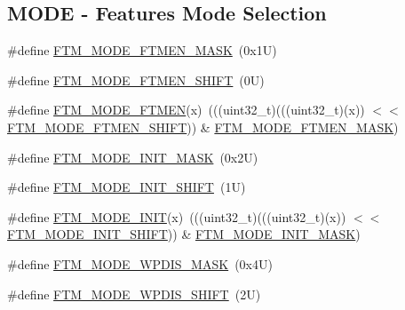 \subsection*{M\+O\+DE -\/ Features Mode Selection}
\begin{DoxyCompactItemize}
\item 
\#define \mbox{\hyperlink{group___f_t_m___register___masks_ga3142bc5c6261a7c04c95844ef35edd5b}{F\+T\+M\+\_\+\+M\+O\+D\+E\+\_\+\+F\+T\+M\+E\+N\+\_\+\+M\+A\+SK}}~(0x1\+U)
\item 
\#define \mbox{\hyperlink{group___f_t_m___register___masks_ga38df569e214287fa43254c2ddeafa5b5}{F\+T\+M\+\_\+\+M\+O\+D\+E\+\_\+\+F\+T\+M\+E\+N\+\_\+\+S\+H\+I\+FT}}~(0\+U)
\item 
\#define \mbox{\hyperlink{group___f_t_m___register___masks_ga9546f297f398bafc35e8c72c670b07a0}{F\+T\+M\+\_\+\+M\+O\+D\+E\+\_\+\+F\+T\+M\+EN}}(x)~(((uint32\+\_\+t)(((uint32\+\_\+t)(x)) $<$$<$ \mbox{\hyperlink{group___f_t_m___register___masks_ga38df569e214287fa43254c2ddeafa5b5}{F\+T\+M\+\_\+\+M\+O\+D\+E\+\_\+\+F\+T\+M\+E\+N\+\_\+\+S\+H\+I\+FT}})) \& \mbox{\hyperlink{group___f_t_m___register___masks_ga3142bc5c6261a7c04c95844ef35edd5b}{F\+T\+M\+\_\+\+M\+O\+D\+E\+\_\+\+F\+T\+M\+E\+N\+\_\+\+M\+A\+SK}})
\item 
\#define \mbox{\hyperlink{group___f_t_m___register___masks_ga069f8d36fce3b99bf22cf8e588b855bf}{F\+T\+M\+\_\+\+M\+O\+D\+E\+\_\+\+I\+N\+I\+T\+\_\+\+M\+A\+SK}}~(0x2\+U)
\item 
\#define \mbox{\hyperlink{group___f_t_m___register___masks_ga0d0d007a2359f31a0cf50b06acef810c}{F\+T\+M\+\_\+\+M\+O\+D\+E\+\_\+\+I\+N\+I\+T\+\_\+\+S\+H\+I\+FT}}~(1\+U)
\item 
\#define \mbox{\hyperlink{group___f_t_m___register___masks_ga263317f5ce69cdbd5bf2353b64d65325}{F\+T\+M\+\_\+\+M\+O\+D\+E\+\_\+\+I\+N\+IT}}(x)~(((uint32\+\_\+t)(((uint32\+\_\+t)(x)) $<$$<$ \mbox{\hyperlink{group___f_t_m___register___masks_ga0d0d007a2359f31a0cf50b06acef810c}{F\+T\+M\+\_\+\+M\+O\+D\+E\+\_\+\+I\+N\+I\+T\+\_\+\+S\+H\+I\+FT}})) \& \mbox{\hyperlink{group___f_t_m___register___masks_ga069f8d36fce3b99bf22cf8e588b855bf}{F\+T\+M\+\_\+\+M\+O\+D\+E\+\_\+\+I\+N\+I\+T\+\_\+\+M\+A\+SK}})
\item 
\#define \mbox{\hyperlink{group___f_t_m___register___masks_ga1178ceaccafa6eb9f10395901c75f7ba}{F\+T\+M\+\_\+\+M\+O\+D\+E\+\_\+\+W\+P\+D\+I\+S\+\_\+\+M\+A\+SK}}~(0x4\+U)
\item 
\#define \mbox{\hyperlink{group___f_t_m___register___masks_ga36fb0f391d4b52f38caf711ba8d73ae7}{F\+T\+M\+\_\+\+M\+O\+D\+E\+\_\+\+W\+P\+D\+I\+S\+\_\+\+S\+H\+I\+FT}}~(2\+U)

\end{DoxyCompactItemize}
